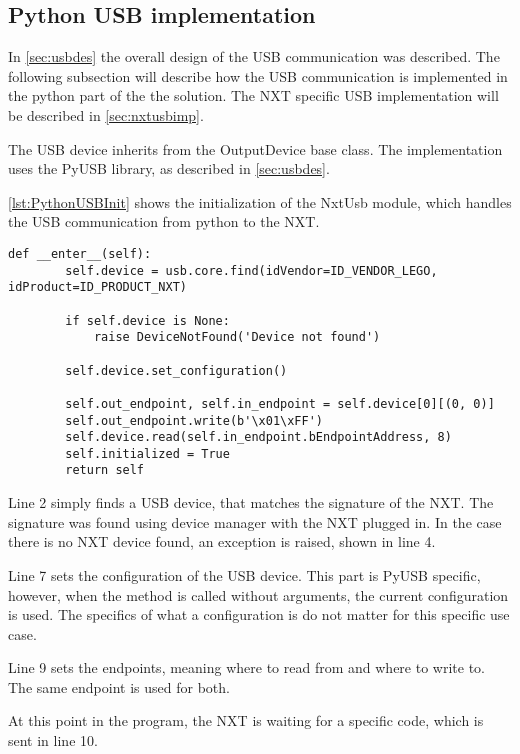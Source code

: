 \subsection{Python USB implementation}\label{sol:subsec:pythonusb}
In \autoref{sec:usbdes} the overall design of the USB communication was described.
The following subsection will describe how the USB communication is implemented in the python part of the the solution.
The NXT specific USB implementation will be described in \autoref{sec:nxtusbimp}.

The USB device inherits from the OutputDevice base class.
The implementation uses the PyUSB library, as described in \autoref{sec:usbdes}\cite{PyUSB}.

\autoref{lst:PythonUSBInit} shows the initialization of the NxtUsb module, which handles the USB communication from python to the NXT.
\begin{lstlisting}[label={lst:PythonUSBInit},caption={The initialization of PyUSB{.} Comments removed}]
    def __enter__(self):
        self.device = usb.core.find(idVendor=ID_VENDOR_LEGO, idProduct=ID_PRODUCT_NXT)

        if self.device is None:
            raise DeviceNotFound('Device not found')

        self.device.set_configuration()

        self.out_endpoint, self.in_endpoint = self.device[0][(0, 0)]
        self.out_endpoint.write(b'\x01\xFF') 
        self.device.read(self.in_endpoint.bEndpointAddress, 8) 
        self.initialized = True
        return self
\end{lstlisting}
Line 2 simply finds a USB device, that matches the signature of the NXT.
The signature was found using device manager with the NXT plugged in.
In the case there is no NXT device found, an exception is raised, shown in line 4.

Line 7 sets the configuration of the USB device.
This part is PyUSB specific, however, when the method is called without arguments, the current configuration is used.
The specifics of what a configuration is do not matter for this specific use case.

Line 9 sets the endpoints, meaning where to read from and where to write to.
The same endpoint is used for both.

At this point in the program, the NXT is waiting for a specific code, which is sent in line 10.

